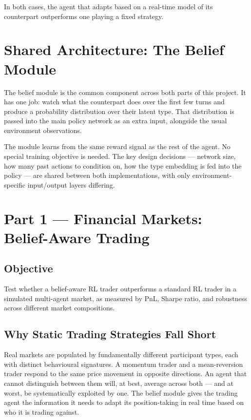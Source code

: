 \documentclass[11pt, a4paper]{article}
\begin{document}
In both cases, the agent that adapts based on a real-time model of its counterpart outperforms one playing a fixed strategy.

\section{Shared Architecture: The Belief Module}

The belief module is the common component across both parts of this project. It has one job: watch what the counterpart does over the first few turns and produce a probability distribution over their latent type. That distribution is passed into the main policy network as an extra input, alongside the usual environment observations.

The module learns from the same reward signal as the rest of the agent. No special training objective is needed. The key design decisions --- network size, how many past actions to condition on, how the type embedding is fed into the policy --- are shared between both implementations, with only environment-specific input/output layers differing.

\section{Part 1 --- Financial Markets: Belief-Aware Trading}

\subsection{Objective}

Test whether a belief-aware RL trader outperforms a standard RL trader in a simulated multi-agent market, as measured by PnL, Sharpe ratio, and robustness across different market compositions.

\subsection{Why Static Trading Strategies Fall Short}

Real markets are populated by fundamentally different participant types, each with distinct behavioural signatures. A momentum trader and a mean-reversion trader respond to the same price movement in opposite directions. An agent that cannot distinguish between them will, at best, average across both --- and at worst, be systematically exploited by one. The belief module gives the trading agent the information it needs to adapt its position-taking in real time based on who it is trading against.
\end{document}
